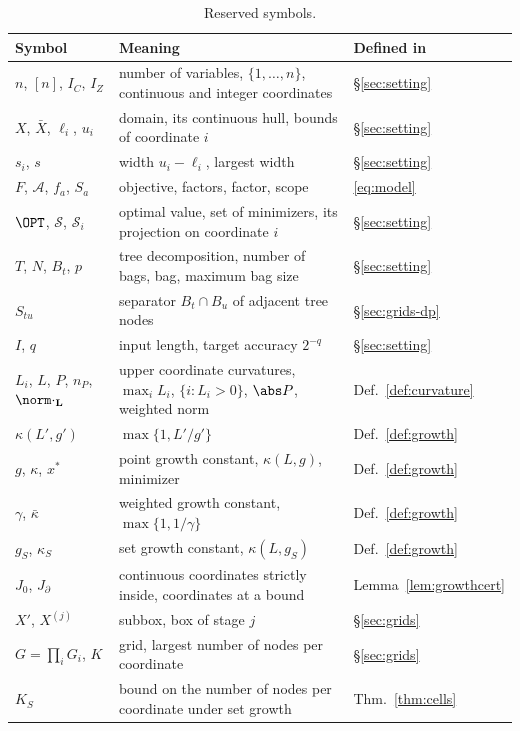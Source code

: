 \begin{table}[htbp]
\centering
\small
\caption{Reserved symbols.}\label{tab:notation}
\begin{tabular}{@{}lll@{}}
\toprule
Symbol & Meaning & Defined in\\
\midrule
$n$, $[n]$, $I_C$, $I_Z$ & number of variables, $\{1,\dots,n\}$, continuous and integer coordinates & \S\ref{sec:setting}\\
$X$, $\bar X$, $\ell_i$, $u_i$ & domain, its continuous hull, bounds of coordinate $i$ & \S\ref{sec:setting}\\
$s_i$, $s$ & width $u_i-\ell_i$, largest width & \S\ref{sec:setting}\\
$F$, $\mathcal A$, $f_a$, $S_a$ & objective, factors, factor, scope & \eqref{eq:model}\\
$\OPT$, $\mathcal S$, $\mathcal S_i$ & optimal value, set of minimizers, its projection on coordinate $i$ & \S\ref{sec:setting}\\
$T$, $N$, $B_t$, $p$ & tree decomposition, number of bags, bag, maximum bag size & \S\ref{sec:setting}\\
$S_{tu}$ & separator $B_t\cap B_u$ of adjacent tree nodes & \S\ref{sec:grids-dp}\\
$I$, $q$ & input length, target accuracy $2^{-q}$ & \S\ref{sec:setting}\\
$L_i$, $L$, $P$, $n_P$, $\norm\cdot_{\mathbf L}$ & upper coordinate curvatures, $\max_iL_i$, $\{i:L_i>0\}$, $\abs P$, weighted norm & Def.~\ref{def:curvature}\\
$\kappa(L',g')$ & $\max\{1,L'/g'\}$ & Def.~\ref{def:growth}\\
$g$, $\kappa$, $x^*$ & point growth constant, $\kappa(L,g)$, minimizer & Def.~\ref{def:growth}\\
$\gamma$, $\bar\kappa$ & weighted growth constant, $\max\{1,1/\gamma\}$ & Def.~\ref{def:growth}\\
$g_S$, $\kappa_S$ & set growth constant, $\kappa(L,g_S)$ & Def.~\ref{def:growth}\\
$J_0$, $J_\partial$ & continuous coordinates strictly inside, coordinates at a bound & Lemma~\ref{lem:growthcert}\\
$X'$, $X^{(j)}$ & subbox, box of stage $j$ & \S\ref{sec:grids}\\
$G=\prod_iG_i$, $K$ & grid, largest number of nodes per coordinate & \S\ref{sec:grids}\\
$K_S$ & bound on the number of nodes per coordinate under set growth & Thm.~\ref{thm:cells}\\

\end{tabular}
\end{table}
